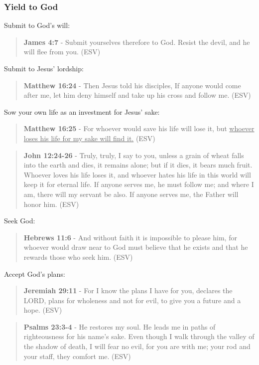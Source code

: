 \documentclass[11pt]{article}
\begin{document}
\subsubsection{Yield to God}
\label{sec:org1c5b939}
Submit to God's will:

\begin{quote}
\textbf{James 4:7} - Submit yourselves therefore to God. Resist the devil, and he will flee from you. (ESV)
\end{quote}

Submit to Jesus' lordship:

\begin{quote}
\textbf{Matthew 16:24} - Then Jesus told his disciples, If anyone would come after me, let him deny himself and take up his cross and follow me. (ESV)
\end{quote}

Sow your own life as an investment for Jesus' sake:

\begin{quote}
\textbf{Matthew 16:25} - For whoever would save his life will lose it, but \uline{whoever loses his life for my sake will find it.} (ESV)
\end{quote}

\begin{quote}
\textbf{John 12:24-26} - Truly, truly, I say to you, unless a grain of wheat falls into the earth and dies, it remains alone; but if it dies, it bears much fruit. Whoever loves his life loses it, and whoever hates his life in this world will keep it for eternal life. If anyone serves me, he must follow me; and where I am, there will my servant be also. If anyone serves me, the Father will honor him. (ESV)
\end{quote}

Seek God:

\begin{quote}
\textbf{Hebrews 11:6} - And without faith it is impossible to please him, for whoever would draw near to God must believe that he exists and that he rewards those who seek him. (ESV)
\end{quote}

Accept God's plans:

\begin{quote}
\textbf{Jeremiah 29:11} - For I know the plans I have for you, declares the LORD, plans for wholeness and not for evil, to give you a future and a hope. (ESV)
\end{quote}

\begin{quote}
\textbf{Psalms 23:3-4} - He restores my soul. He leads me in paths of righteousness for his name's sake. Even though I walk through the valley of the shadow of death, I will fear no evil, for you are with me; your rod and your staff, they comfort me. (ESV)
\end{quote}
\end{document}
